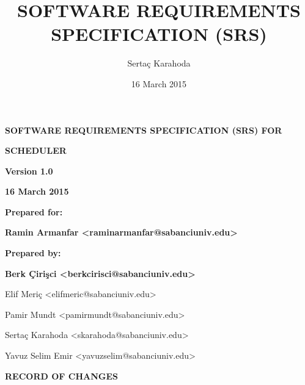 \documentclass[twoside,letterpaper]{article}
\title{SOFTWARE REQUIREMENTS SPECIFICATION (SRS)}
\author{Serta\c{c} Karahoda}
\date{16 March 2015}
\begin{document}
\setcounter{page}{1}\pagestyle{Preface}

\vspace*{1.5in}
{\centering{}\bfseries\color{black}
SOFTWARE REQUIREMENTS SPECIFICATION (SRS) FOR 
\par}

\bigskip

{\centering{}\bfseries\color{black}
SCHEDULER
\par}


\bigskip


\bigskip


\bigskip


\bigskip

{\centering{}\bfseries\color{black}
Version 1.0
\par}

{\centering{}\bfseries\color{black}
16 March 2015
\par}


\bigskip


\bigskip

{\centering{}\bfseries\color{black}
Prepared for:
\par}

{\centering{}\bfseries\color{black}
Ramin Armanfar <raminarmanfar@sabanciuniv.edu>

\par}


\bigskip


\bigskip

{\centering{}\bfseries\color{black}
Prepared by:
\par}

{\centering{}\bfseries\color{black}
Berk \c{C}iri\c{s}ci <berkcirisci@sabanciuniv.edu>

Elif Meri\c{c} <elifmeric@sabanciuniv.edu>

Pamir Mundt <pamirmundt@sabanciuniv.edu>

Serta\c{c} Karahoda <skarahoda@sabanciuniv.edu>

Yavuz Selim Emir <yavuzselim@sabanciuniv.edu>
\par}



\bigskip

{\centering{}\bfseries\color{black}
RECORD OF CHANGES
\par}
\end{document}
